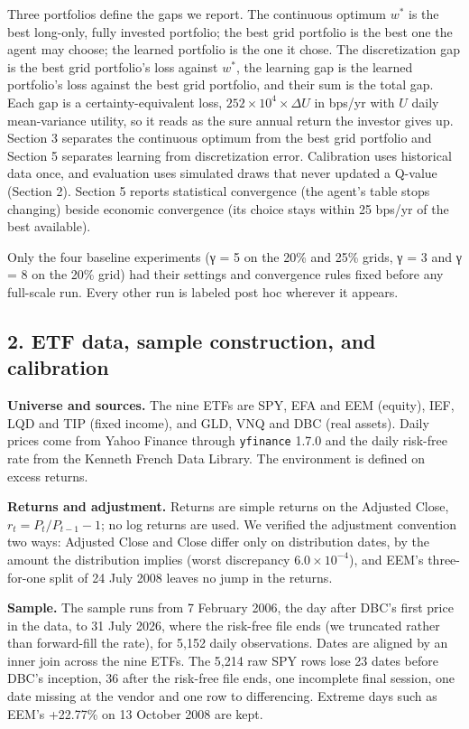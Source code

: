 \documentclass[
  11pt]{article}
\begin{document}
Three portfolios define the gaps we report. The continuous optimum
\(w^*\) is the best long-only, fully invested portfolio; the best grid
portfolio is the best one the agent may choose; the learned portfolio is
the one it chose. The discretization gap is the best grid portfolio's
loss against \(w^*\), the learning gap is the learned portfolio's loss
against the best grid portfolio, and their sum is the total gap. Each
gap is a certainty-equivalent loss, \(252 \times 10^4 \times \Delta U\)
in bps/yr with \(U\) daily mean-variance utility, so it reads as the
sure annual return the investor gives up. Section 3 separates the
continuous optimum from the best grid portfolio and Section 5 separates
learning from discretization error. Calibration uses historical data
once, and evaluation uses simulated draws that never updated a Q-value
(Section 2). Section 5 reports statistical convergence (the agent's
table stops changing) beside economic convergence (its choice stays
within 25 bps/yr of the best available).

Only the four baseline experiments (γ = 5 on the 20\% and 25\% grids, γ
= 3 and γ = 8 on the 20\% grid) had their settings and convergence rules
fixed before any full-scale run. Every other run is labeled post hoc
wherever it appears.

\subsection{2. ETF data, sample construction, and
calibration}\label{etf-data-sample-construction-and-calibration}

\textbf{Universe and sources.} The nine ETFs are SPY, EFA and EEM
(equity), IEF, LQD and TIP (fixed income), and GLD, VNQ and DBC (real
assets). Daily prices come from Yahoo Finance through \texttt{yfinance}
1.7.0 and the daily risk-free rate from the Kenneth French Data Library.
The environment is defined on excess returns.

\textbf{Returns and adjustment.} Returns are simple returns on the
Adjusted Close, \(r_t = P_t / P_{t-1} - 1\); no log returns are used. We
verified the adjustment convention two ways: Adjusted Close and Close
differ only on distribution dates, by the amount the distribution
implies (worst discrepancy \(6.0 \times 10^{-4}\)), and EEM's
three-for-one split of 24 July 2008 leaves no jump in the returns.

\textbf{Sample.} The sample runs from 7 February 2006, the day after
DBC's first price in the data, to 31 July 2026, where the risk-free file
ends (we truncated rather than forward-fill the rate), for 5,152 daily
observations. Dates are aligned by an inner join across the nine ETFs.
The 5,214 raw SPY rows lose 23 dates before DBC's inception, 36 after
the risk-free file ends, one incomplete final session, one date missing
at the vendor and one row to differencing. Extreme days such as EEM's
+22.77\% on 13 October 2008 are kept.
\end{document}
